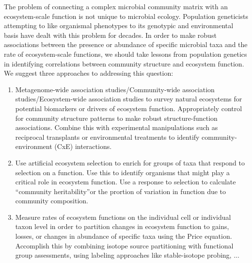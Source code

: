 \documentclass{article}
\begin{document}
The problem of
connecting a complex microbial community matrix with an ecosystem-scale function
is not unique to microbial ecology. Population geneticists attempting to like
organismal phenotypes to its genotypic and environmental basis have dealt with
this problem for decades. In order to make robust associations between the
presence or abundance of specific microbial taxa and the rate of ecosystem-scale
functions, we should take lessons from population genetics in identifying
correlations between community structure and ecosystem function. We suggest
three approaches to addressing this question:

\begin{enumerate}
  \item Metagenome-wide association studies/Community-wide association
    studies/Ecosystem-wide association studies to survey natural ecosystems
    for potential biomarkers or drivers of ecosystem function. Appropriately
    control for community structure patterns to make robust
    structure-function associations. Combine this
    with experimental manipulations such as reciprocal transplants or
    environmental treatments to identify community-environment (CxE)
    interactions.
  \item Use artificial ecosystem selection to enrich for groups of taxa that
    respond to selection on a function. Use this to identify organisms that
    might play a critical role in ecosystem function. Use a response to
    selection to calculate ``community heritability''or the prortion of
    variation in function due to community composition.
  \item Measure rates of ecosystem functions on the individual cell or
    individual taxon level in order to partition changes in ecosystem
    function to gains, losses, or changes in abundance of
    specific taxa using the Price equation. Accomplish this by combining
    isotope source partitioning with functional group assessments, using
    labeling approaches like stable-isotope probing, ...
\end{enumerate}

 

\end{document}
